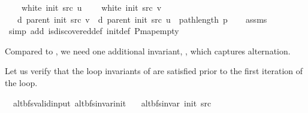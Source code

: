 \begin{isabellebody}
\ \ \ {\isachardoublequoteopen}{\isasymnot}\ white\ {\isacharparenleft}{\kern0pt}init\ src{\isacharparenright}{\kern0pt}\ u{\isachardoublequoteclose}\isanewline
\ \ \ {\isachardoublequoteopen}{\isasymnot}\ white\ {\isacharparenleft}{\kern0pt}init\ src{\isacharparenright}{\kern0pt}\ v{\isachardoublequoteclose}\isanewline
\ \ \ {\isachardoublequoteopen}d\ {\isacharparenleft}{\kern0pt}parent\ {\isacharparenleft}{\kern0pt}init\ src{\isacharparenright}{\kern0pt}{\isacharparenright}{\kern0pt}\ v\ {\isasymle}\ d\ {\isacharparenleft}{\kern0pt}parent\ {\isacharparenleft}{\kern0pt}init\ src{\isacharparenright}{\kern0pt}{\isacharparenright}{\kern0pt}\ u\ {\isacharplus}{\kern0pt}\ path{\isacharunderscore}{\kern0pt}length\ p{\isachardoublequoteclose}%
\endisataginvisible
{\isafoldinvisible}%
%
\isadeliminvisible
\isanewline
%
\endisadeliminvisible
%
\isadelimproof
\ \ %
\endisadelimproof
%
\isatagproof
{}\isamarkupfalse%
\ assms\isanewline
\ \ \isamarkupfalse%
\ {\isacharparenleft}{\kern0pt}simp\ add{\isacharcolon}{\kern0pt}\ is{\isacharunderscore}{\kern0pt}discovered{\isacharunderscore}{\kern0pt}def\ init{\isacharunderscore}{\kern0pt}def\ P{\isachardot}{\kern0pt}map{\isacharunderscore}{\kern0pt}empty{\isacharparenright}{\kern0pt}%
\endisatagproof
{\isafoldproof}%
%
\isadelimproof
%
\endisadelimproof
%
\begin{isamarkuptext}%
Compared to , we need one additional invariant,
, which captures alternation.%
\end{isamarkuptext}\isamarkuptrue%
%
\begin{isamarkuptext}%
Let us verify that the loop invariants of  are satisfied prior to the first
iteration of the loop.%
\end{isamarkuptext}\isamarkuptrue%
\isamarkupfalse%
\ {\isacharparenleft}{\kern0pt}\ alt{\isacharunderscore}{\kern0pt}bfs{\isacharunderscore}{\kern0pt}valid{\isacharunderscore}{\kern0pt}input{\isacharparenright}{\kern0pt}\ alt{\isacharunderscore}{\kern0pt}bfs{\isacharunderscore}{\kern0pt}invar{\isacharunderscore}{\kern0pt}init{\isacharcolon}{\kern0pt}\isanewline
\ \ \ {\isachardoublequoteopen}alt{\isacharunderscore}{\kern0pt}bfs{\isacharunderscore}{\kern0pt}invar{\isacharprime}{\kern0pt}{\isacharprime}{\kern0pt}\ {\isacharparenleft}{\kern0pt}init\ src{\isacharparenright}{\kern0pt}{\isachardoublequoteclose}\isanewline

\end{isabellebody}
